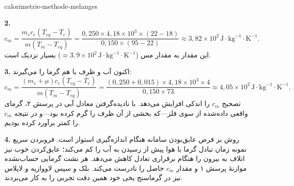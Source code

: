 \begin{exo}{calorimetrie-methode-melanges}
\begin{solution}
\textbf{2.}
\[
c_m=\frac{m_ec_e(T_{eq}-T_e)}{m(T_m-T_{eq})}
=\frac{0{,}250\times4{,}18\times10^3\times(22-18)}{0{,}150\times(95-22)}
\approx3{,}82\times10^2\,\text{J}\!\cdot\!\text{kg}^{-1}\!\cdot\!\text{K}^{-1}.
\]
این مقدار به مقدار مس ($\approx3{,}9\times10^2\,\text{J}\!\cdot\!\text{kg}^{-1}\!\cdot\!\text{K}^{-1}$) بسیار نزدیک است.

\textbf{3.} اکنون آب و ظرف با هم گرما را می‌گیرند:
\[
c_m=\frac{(m_e+\mu)c_e(T_{eq}-T_e)}{m(T_m-T_{eq})}
=\frac{(0{,}250+0{,}015)\times4{,}18\times10^3\times4}{0{,}150\times73}
\approx4{,}05\times10^2\,\text{J}\!\cdot\!\text{kg}^{-1}\!\cdot\!\text{K}^{-1}.
\]
تصحیح $c_m$ را اندکی افزایش می‌دهد. با نادیده‌گرفتن معادل آبی در پرسش ۲، گرمای واقعی داده‌شده از سوی فلز—که بخشی از آن ظرف را گرم کرده بود—و در نتیجه $c_m$ را کمتر برآورد کرده بودیم.

\textbf{4.} روش بر فرض عایق‌بودن سامانه هنگام اندازه‌گیری استوار است. فروبردن سریع نمونه زمان تبادل گرما با هوا پیش از رسیدن به آب را کم می‌کند؛ عایق‌کردن خوب نیز اتلاف به بیرون را هنگام برقراری تعادل کاهش می‌دهد. هر نشت گرمایی حساب‌نشده موازنهٔ پرسش ۱ و مقدار $c_m$ حاصل را نادرست می‌کند. بلک و سپس لاووازیه و لاپلاس نیز در گرماسنج یخی خود همین دقت تجربی را به کار می‌بردند.
\end{solution}
\end{exo}

